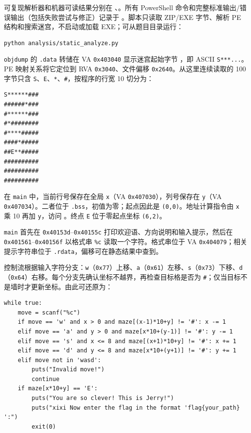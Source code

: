 可复现解析器和机器可读结果分别在 \texttt{}、\texttt{}。所有 PowerShell 命令和完整标准输出/错误输出（包括失败尝试与修正）记录于 \texttt{}。脚本只读取 ZIP/EXE 字节、解析 PE 结构和搜索迷宫，不启动或加载 EXE；可从题目目录运行：

\begin{verbatim}
python analysis/static_analyze.py
\end{verbatim}

\texttt{objdump} 的 \texttt{.data} 转储在 VA \texttt{0x403040} 显示迷宫起始字节 \texttt{}，即 ASCII \texttt{S***...}。PE 映射关系将它定位到 RVA \texttt{0x3040}、文件偏移 \texttt{0x2640}。从这里连续读取的 100 字节只含 \texttt{S}、\texttt{E}、\texttt{*}、\texttt{\#}，按程序的行宽 10 切分为：

\begin{verbatim}
S******###
######*###
#******###
#*########
#****#####
####*#####
##E**#####
##########
##########
##########
\end{verbatim}

在 \texttt{main} 中，当前行号保存在全局 \texttt{x}（VA \texttt{0x407030}），列号保存在 \texttt{y}（VA \texttt{0x407034}）。二者位于 \texttt{.bss}，初值为零；起点因此是 \texttt{(0,0)}。地址计算指令由 \texttt{x} 乘 10 再加 \texttt{y}，访问 \texttt{}。终点 \texttt{E} 位于零起点坐标 \texttt{(6,2)}。

\texttt{main} 首先在 \texttt{0x40153d}--\texttt{0x40155c} 打印欢迎语、方向说明和输入提示，然后在 \texttt{0x401561}--\texttt{0x40156f} 以格式串 \texttt{\%c} 读取一个字符。格式串位于 VA \texttt{0x404079}；相关提示字符串位于 \texttt{.rdata}，偏移可在静态结果中查到。

控制流根据输入字符分支：\texttt{w}（\texttt{0x77}）上移、\texttt{a}（\texttt{0x61}）左移、\texttt{s}（\texttt{0x73}）下移、\texttt{d}（\texttt{0x64}）右移。每个分支先确认坐标不越界，再检查目标格是否为 \texttt{\#}；仅当目标不是墙时才更新坐标。由此可还原为：

\begin{verbatim}
while true:
    move = scanf("%c")
    if move == 'w' and x > 0 and maze[(x-1)*10+y] != '#': x -= 1
    elif move == 'a' and y > 0 and maze[x*10+(y-1)] != '#': y -= 1
    elif move == 's' and x <= 8 and maze[(x+1)*10+y] != '#': x += 1
    elif move == 'd' and y <= 8 and maze[x*10+(y+1)] != '#': y += 1
    elif move not in 'wasd':
        puts("Invalid move!")
        continue
    if maze[x*10+y] == 'E':
        puts("You are so clever! This is Jerry!")
        puts("xixi Now enter the flag in the format 'flag{your_path} ':")
        exit(0)
\end{verbatim}

